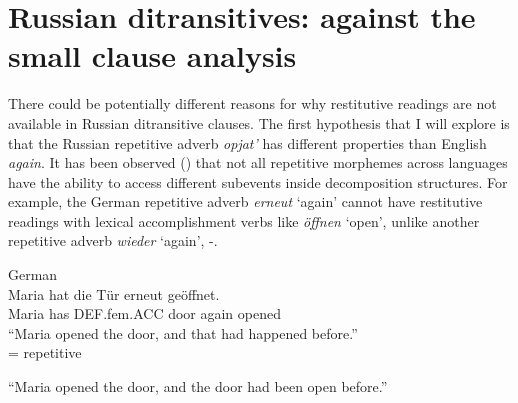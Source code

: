 \documentclass[output=paper,modfonts,nonflat,
 hidelinks
]{langsci/langscibook}
\begin{document}
\section{Russian ditransitives: against the small clause analysis}

There could be potentially different reasons for why restitutive readings are not available in Russian ditransitive clauses. The first hypothesis that I will explore is that the Russian repetitive adverb \textit{opjat’} has different properties than English \textit{again}. It has been observed (\citealt{RappvonStechow1999,Beck2005,AlexiadouEtAl2014,LechnerEtAl2015}) that not all repetitive morphemes across languages have the ability to access different subevents inside decomposition structures. For example, the German repetitive adverb \textit{erneut} ‘again’ cannot have restitutive readings with lexical accomplishment verbs like \textit{öffnen} ‘open’, unlike another repetitive adverb \textit{wieder} ‘again’, -.


 \ea\label{ex:bondarenko:}
{German}\\

\gll Maria hat die Tür erneut geöffnet.\\
     Maria has DEF.fem.ACC door again opened\\
\ea “Maria opened the door, and that had happened before.”\\
= {repetitive}

\ex *“Maria opened the door, and the door had been open before.”\footnotemark
\z
\z
{}

\begin{quote}
\citep[12]{Beck2005}
\end{quote}
\end{document}
